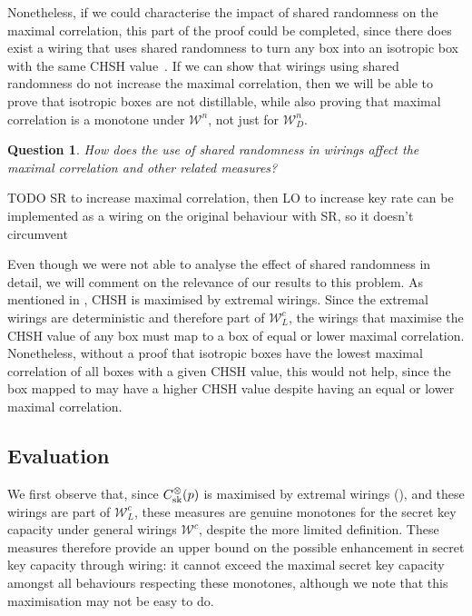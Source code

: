 \documentclass[10pt, a4paper]{article}
\numberwithin{equation}{section} %
\theoremstyle{definition}
\theoremstyle{plain}
\newtheorem{question}{Question}
\newcommand{\?}{\mathrel{?}} %
\newcommand{\sW}{\mathcal{W}}
\newcommand{\sk}{\rm sk}
\begin{document}
                  Nonetheless, if we could characterise the impact of shared randomness on the maximal correlation, this part of the proof could be completed, since there does exist a wiring that uses shared randomness to turn any box into an isotropic box with the same CHSH value~\cite{NSTheories}. If we can show that wirings using shared randomness do not increase the maximal correlation, then we will be able to prove that isotropic boxes are not distillable, while also proving that maximal correlation is a monotone under \(\sW^n\), not just for \(\sW_D^n\).
                  \begin{question}
                    How does the use of shared randomness in wirings affect the maximal correlation and other related measures?
                  \end{question}

                  TODO SR to increase maximal correlation, then LO to increase key rate can be implemented as a wiring on the original behaviour with SR, so it doesn't circumvent

                  Even though we were not able to analyse the effect of shared randomness in detail, we will comment on the relevance of our results to this problem. As mentioned in , CHSH is maximised by extremal wirings. Since the extremal wirings are deterministic and therefore part of \(\sW_L^c\), the wirings that maximise the CHSH value of any box must map to a box of equal or lower maximal correlation. Nonetheless, without a proof that isotropic boxes have the lowest maximal correlation of all boxes with a given CHSH value, this would not help, since the box mapped to may have a higher CHSH value despite having an equal or lower maximal correlation.

                  \subsection{Evaluation}

                  We first observe that, since \(C^{\otimes}_{\sk}(p)\) is maximised by extremal wirings (), and these wirings are part of \(\sW_L^c\), these measures are genuine monotones for the secret key capacity under general wirings \(\sW^c\), despite the more limited definition. These measures therefore provide an upper bound on the possible enhancement in secret key capacity through wiring: it cannot exceed the maximal secret key capacity amongst all behaviours respecting these monotones, although we note that this maximisation may not be easy to do.
\end{document}
